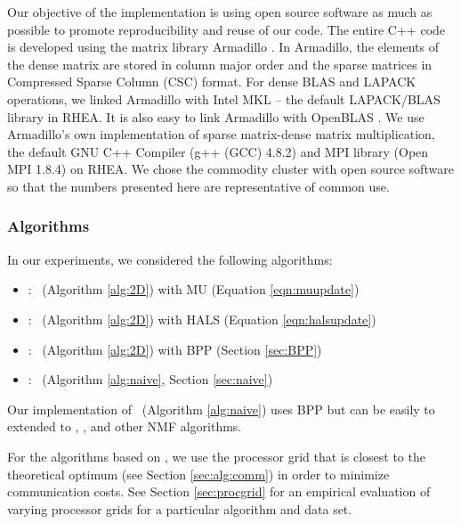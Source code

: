 Our objective of the implementation is using open source software as much as possible 
to promote reproducibility and reuse of our code.
The entire C++ code is developed using the matrix library Armadillo \cite{sanderson2010}. 
In Armadillo, the elements of the dense matrix are stored in column major order and the sparse matrices in Compressed Sparse Column (CSC) format.
For dense BLAS and LAPACK operations, we linked Armadillo with Intel MKL -- the default LAPACK/BLAS library in RHEA. It is also easy to link Armadillo with OpenBLAS \cite{xianyi2015}. 
We use Armadillo's own implementation of sparse matrix-dense matrix multiplication, the default GNU C++ Compiler (g++ (GCC) 4.8.2) and MPI library (Open MPI 1.8.4)  on RHEA.  We chose the commodity cluster with open source software so that the numbers presented here are representative of common use. 


\subsubsection{Algorithms}

In our experiments, we considered the following algorithms: 
\begin{itemize}
	\item \MU: \ParNMF\ (Algorithm \ref{alg:2D}) with MU (Equation \eqref{eqn:muupdate})
	\item \HALS: \ParNMF\ (Algorithm \ref{alg:2D}) with HALS (Equation \eqref{eqn:halsupdate})
	\item \BPP: \ParNMF\ (Algorithm \ref{alg:2D}) with BPP (Section \ref{sec:BPP})
	\item \Naive: \NaiveAlg\ (Algorithm \ref{alg:naive}, Section \ref{sec:naive})
\end{itemize}

Our implementation of \Naive\ (Algorithm \ref{alg:naive}) uses BPP but can be easily to extended to \MU, \HALS, and other NMF algorithms. 

For the algorithms based on \ParNMF, we use the processor grid that is closest to the theoretical optimum (see Section \ref{sec:alg:comm}) in order to minimize communication costs.
See Section \ref{sec:procgrid} for an empirical evaluation of varying processor grids for a particular algorithm and data set.

